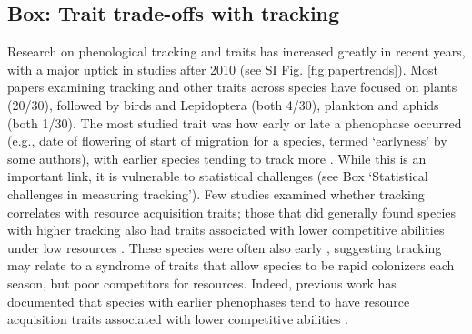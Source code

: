\documentclass[11pt,letterpaper]{article}
\begin{document}
\subsection{Box: Trait trade-offs with tracking} %
Research on phenological tracking and traits has increased greatly in recent years, with a major uptick in studies after 2010 (see SI Fig. \ref{fig:papertrends}). Most papers examining tracking and other traits across species have focused on plants (20/30), followed by birds and Lepidoptera (both 4/30), plankton and aphids (both 1/30). The most studied trait was how early or late a phenophase occurred (e.g., date of flowering of start of migration for a species, termed `earlyness' by some authors), with earlier species tending to track more \citep[studies included both birds and Lepidotera,][]{Diamond:2011nx,Ishioka2013,kharouba2014,jing2016,du2017}. While this is an important link, it is vulnerable to statistical challenges (see Box `Statistical challenges in measuring tracking'). Few studies examined whether tracking correlates with resource acquisition traits; those that did generally found species with higher tracking also had traits associated with lower competitive abilities under low resources \citep[e.g., being shallower or lacking a taproot rooted][]{Dorji2013,lasky2016,Zhu2016BioLetters}. These species were often also early \citep[e.g.,][]{Dorji2013,Zhu2016BioLetters}, suggesting tracking may relate to a syndrome of traits that allow species to be rapid colonizers each season, but poor competitors for resources. Indeed, previous work has documented that species with earlier phenophases tend to have resource acquisition traits associated with lower competitive abilities \citep[e.g., they tend to be of lower height, have shallower roots, narrower diameter vessels, thinner leaves, and grow faster, reviewed in][]{wolkovich2014aob}. %
\end{document}
